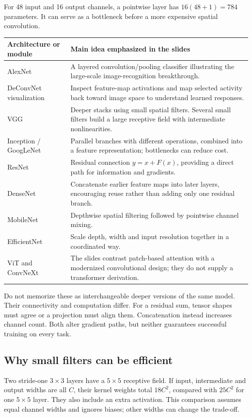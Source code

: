 \documentclass[11pt]{article}
\begin{document}
For 48 input and 16 output channels, a pointwise layer has $16(48+1)=784$ parameters. It can serve as a bottleneck before a more expensive spatial convolution.
\begin{longtable}{@{}P{.21\textwidth}P{.70\textwidth}@{}}
\toprule Architecture or module & Main idea emphasized in the slides\\\midrule\endhead
AlexNet & A layered convolution/pooling classifier illustrating the large-scale image-recognition breakthrough.\\
DeConvNet visualization & Inspect feature-map activations and map selected activity back toward image space to understand learned responses.\\
VGG & Deeper stacks using small spatial filters. Several small filters build a large receptive field with intermediate nonlinearities.\\
Inception / GoogLeNet & Parallel branches with different operations, combined into a feature representation; bottlenecks can reduce cost.\\
ResNet & Residual connection $y=x+F(x)$, providing a direct path for information and gradients.\\
DenseNet & Concatenate earlier feature maps into later layers, encouraging reuse rather than adding only one residual branch.\\
MobileNet & Depthwise spatial filtering followed by pointwise channel mixing.\\
EfficientNet & Scale depth, width and input resolution together in a coordinated way.\\
ViT and ConvNeXt & The slides contrast patch-based attention with a modernized convolutional design; they do not supply a transformer derivation.\\\bottomrule
\end{longtable}
Do not memorize these as interchangeable deeper versions of the same model. Their connectivity and computation differ. For a residual sum, tensor shapes must agree or a projection must align them. Concatenation instead increases channel count. Both alter gradient paths, but neither guarantees successful training on every task.
\subsection{Why small filters can be efficient}
Two stride-one $3\times3$ layers have a $5\times5$ receptive field. If input, intermediate and output widths are all $C$, their kernel weights total $18C^2$, compared with $25C^2$ for one $5\times5$ layer. They also include an extra activation. This comparison assumes equal channel widths and ignores biases; other widths can change the trade-off.
\end{document}
